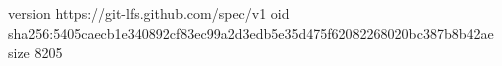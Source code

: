version https://git-lfs.github.com/spec/v1
oid sha256:5405caecb1e340892cf83ec99a2d3edb5e35d475f62082268020bc387b8b42ae
size 8205
